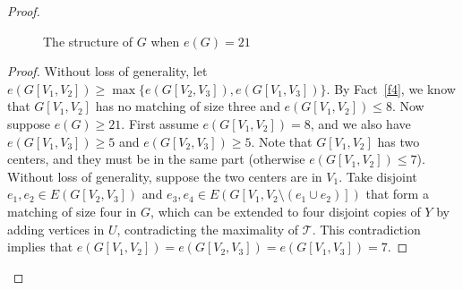 \documentclass[11pt, reqno]{amsart}    	%
\theoremstyle{definition}
\def\cT{\mathcal T}
\numberwithin{equation}{section}
\begin{document}
\begin{proof}
\begin{figure}[h]
\begin{center}
				
				\caption{The structure of $ G $ when $ e(G)=21 $}
				\label{figure1}	
			\end{center}
		\end{figure}
		
		
		
		
		\begin{proof}
			Without loss of generality, let $e(G[V_{1},V_{2}])\ge \max\{e(G[V_{2},V_{3}]),e(G[V_{1},V_{3}])\}$.
			By Fact~\ref{f4}, we know that $G[V_{1},V_{2}] $ has no matching of size three and $e(G[V_{1},V_{2}])\le8$. 
			Now suppose $e(G)\ge 21$. %
			First assume $e(G[V_{1},V_{2}]) =  8$, and we also have $e(G[V_{1},V_{3}])\ge 5$ and $e(G[V_{2},V_{3}])\ge 5$.
			Note that $ G[V_{1},V_{2}] $ has two centers, and they must be in the same part (otherwise $e(G[V_{1},V_{2}]) \le 7$).
			Without loss of generality, suppose the two centers are in $ V_1 $. 
			Take disjoint $e_1,e_2\in E(G[V_{2},V_{3}])$ and  $e_3,e_4\in E(G [V_{1},V_{2} \setminus(e_1\cup e_2)])$ that form a matching of size four in $G$, which can be extended to four disjoint copies of $Y$ by adding vertices in $U$, contradicting the maximality of $\cT$.
			This contradiction implies that $e(G[V_{1},V_{2}])= e(G[V_{2},V_{3}]) =e(G[V_{1},V_{3}]) =7$.
			
			

\end{proof}
\end{proof}
\end{document}
